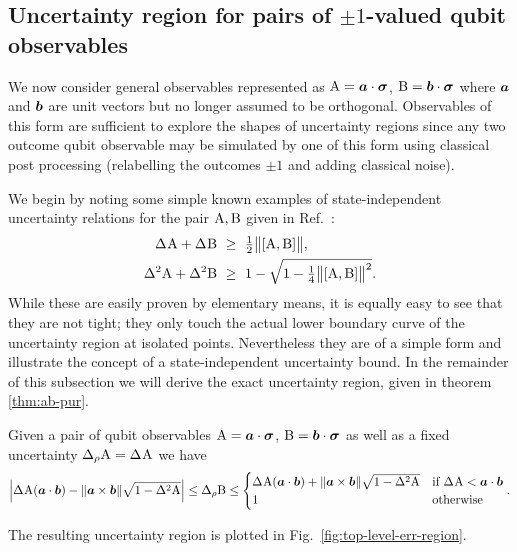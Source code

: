 \subsection{Uncertainty region for pairs of $\pm 1$-valued qubit observables}
\label{sec:qubit-uncertainty}
We  now consider general observables represented as $\operatorname{A}=\bm{a}\cdot{\boldsymbol\sigma}$, $\operatorname{B}=\bm{b}\cdot{\boldsymbol\sigma}$ where $\bm{a}$ and $\bm{b}$ are unit vectors but no longer assumed to be orthogonal. Observables of this form are sufficient to explore the shapes of uncertainty regions since any two outcome qubit observable may be simulated by one of this form using classical post processing (relabelling the outcomes $\pm1$ and adding classical noise).

We begin by noting some simple known examples of state-independent uncertainty relations for the pair $\operatorname{A},\operatorname{B}$ given in Ref.~\cite{BuschLahtiWerner2014}:
\begin{align}
  \label{eqn:straight-lower-bound-blw}
  \sdev{\opa}+\sdev{\opb}\ &\ge \ \tfrac12\bigl\|[\opa,\opb]\bigr\|,\\
  \label{eqn:curved-lower-bound-blw}
  \var{\opa}+\var{\opb}\ &\ge \ 1-\sqrt{1-\tfrac14\bigl\|[\opa,\opb]\bigr\|^2}.
\end{align}
While these are easily proven by elementary means, it is equally easy to see that they are not tight; they only touch the actual lower boundary curve of the uncertainty region at isolated points. Nevertheless they are of a simple form and illustrate the concept of a state-independent uncertainty bound.
In the remainder of this subsection we will derive the exact uncertainty region, given in theorem \ref{thm:ab-pur}.
\begin{thm}\label{thm:ab-pur}
  Given a pair of qubit observables  $\operatorname{A}=\bm{a}\cdot{\boldsymbol\sigma}$, $\operatorname{B}=\bm{b}\cdot{\boldsymbol\sigma}$ as well as a fixed uncertainty $\sdevr{\opa}=\sdev{\opa}$ we have
  \begin{align}\label{eqn:full-qubit-uncertainty region}
    \left|\sdev{\opa} (\boa\cdot\bob) - \|\boa\times\bob\|\sqrt{1-\var \opa}\right|
    \leq \sdevr{\opb} %
                            \leq\begin{cases}
                              \sdev{\opa} (\boa\cdot\bob) + \|\boa\times\bob\|\sqrt{1-\var \opa} & \text{\normalfont if } \sdev{\opa} < \boa\cdot\bob\\
                              1 & \text{\normalfont otherwise}
                            \end{cases}.%
  \end{align}
\end{thm}
The resulting uncertainty region is plotted in Fig.~\ref{fig:top-level-err-region}.

